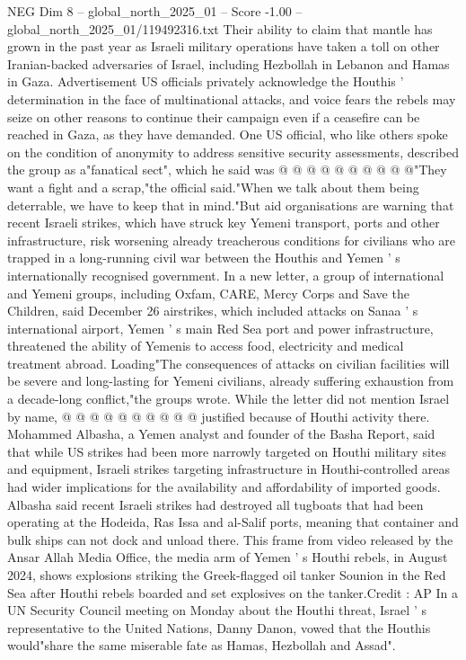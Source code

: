 \begin{textsample}{NEG Dim 8 – global\_north\_2025\_01 – Score -1.00 – global\_north\_2025\_01/119492316.txt}
Their ability to claim that mantle has grown in the past year as Israeli military operations have taken a toll on other Iranian-backed adversaries of Israel, including Hezbollah in Lebanon and Hamas in Gaza.
Advertisement US officials privately acknowledge the Houthis ' determination in the face of multinational attacks, and voice fears the rebels may seize on other reasons to continue their campaign even if a ceasefire can be reached in Gaza, as they have demanded.
One US official, who like others spoke on the condition of anonymity to address sensitive security assessments, described the group as a"fanatical sect", which he said was @ @ @ @ @ @ @ @ @ @"They want a fight and a scrap,"the official said."When we talk about them being deterrable, we have to keep that in mind."But aid organisations are warning that recent Israeli strikes, which have struck key Yemeni transport, ports and other infrastructure, risk worsening already treacherous conditions for civilians who are trapped in a long-running civil war between the Houthis and Yemen ' s internationally recognised government.
In a new letter, a group of international and Yemeni groups, including Oxfam, CARE, Mercy Corps and Save the Children, said December 26 airstrikes, which included attacks on Sanaa ' s international airport, Yemen ' s main Red Sea port and power infrastructure, threatened the ability of Yemenis to access food, electricity and medical treatment abroad.
Loading"The consequences of attacks on civilian facilities will be severe and long-lasting for Yemeni civilians, already suffering exhaustion from a decade-long conflict,"the groups wrote.
While the letter did not mention Israel by name, @ @ @ @ @ @ @ @ @ @ justified because of Houthi activity there.
Mohammed Albasha, a Yemen analyst and founder of the Basha Report, said that while US strikes had been more narrowly targeted on Houthi military sites and equipment, Israeli strikes targeting infrastructure in Houthi-controlled areas had wider implications for the availability and affordability of imported goods.
Albasha said recent Israeli strikes had destroyed all tugboats that had been operating at the Hodeida, Ras Issa and al-Salif ports, meaning that container and bulk ships can not dock and unload there.
This frame from video released by the Ansar Allah Media Office, the media arm of Yemen ' s Houthi rebels, in August 2024, shows explosions striking the Greek-flagged oil tanker Sounion in the Red Sea after Houthi rebels boarded and set explosives on the tanker.Credit : AP In a UN Security Council meeting on Monday about the Houthi threat, Israel ' s representative to the United Nations, Danny Danon, vowed that the Houthis would"share the same miserable fate as Hamas, Hezbollah and Assad".

\end{textsample}
